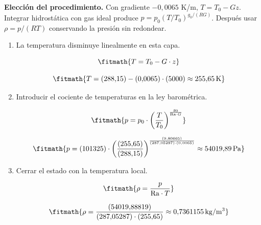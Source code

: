 \noindent\textbf{Elección del procedimiento.} Con gradiente $-0{,}0065$ K/m, $T=T_0-Gz$. Integrar hidrostática con gas ideal produce $p=p_0(T/T_0)^{g_0/(RG)}$. Después usar $\rho=p/(RT)$ conservando la presión sin redondear.

\begin{enumerate}

\item La temperatura disminuye linealmente en esta capa.

\[\fitmath{T=T_{0}-G\cdot z}\]

\[\fitmath{T=(288{,}15)-(0{,}0065)\cdot (5000)\approx 255{,}65\,\mathrm{K}}\]

\item Introducir el cociente de temperaturas en la ley barométrica.

\[\fitmath{p=p_{0}\cdot {\left(\frac{T}{T_{0}}\right)}^{\frac{g_{0}}{\mathrm{Ra}\cdot G}}}\]

\[\fitmath{p=(101325)\cdot {\left(\frac{(255{,}65)}{(288{,}15)}\right)}^{\frac{(9{,}80665)}{(287{,}05287)\cdot (0{,}0065)}}\approx 54019{,}89\,\mathrm{Pa}}\]

\item Cerrar el estado con la temperatura local.

\[\fitmath{\rho=\frac{p}{\mathrm{Ra}\cdot T}}\]

\[\fitmath{\rho=\frac{(54019{,}88819)}{(287{,}05287)\cdot (255{,}65)}\approx 0{,}7361155\,\mathrm{kg/m^{3}}}\]

\end{enumerate}
